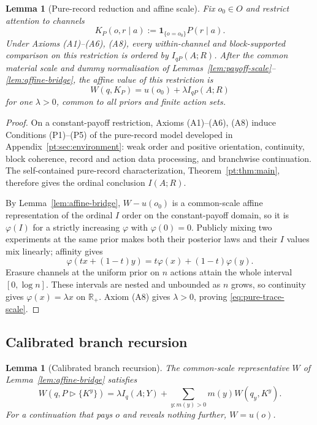 \documentclass[11pt,a4paper]{article}
\newtheorem{lemma}[theorem]{Lemma}
\theoremstyle{definition}
\newcommand{\I}{I}
\newcommand{\1}{\mathbf 1}
\begin{document}
\begin{lemma}[Pure-record reduction and affine scale]\label{lem:trace-engine}
Fix $o_0\in O$ and restrict attention to channels
\[
 K_P(o,r\mid a):=\mathbf 1_{\{o=o_0\}}P(r\mid a).
\]
Under Axioms \textup{(A1)--(A6), (A8)}, every within-channel and block-supported comparison on this restriction is
ordered by $\I_{qP}(A;R)$.  After the common material scale and dummy normalisation of
Lemmas~\ref{lem:payoff-scale}--\ref{lem:affine-bridge}, the affine value of this restriction is
\begin{equation}
 W(q,K_P)=u(o_0)+\lambda\I_{qP}(A;R)
 \label{eq:pure-trace-scale}
\end{equation}
for one $\lambda>0$, common to all priors and finite action sets.
\end{lemma}

\begin{proof}
On a constant-payoff restriction, Axioms \textup{(A1)--(A6), (A8)} induce Conditions
\textup{(P1)--(P5)} of the pure-record model developed in Appendix~\ref{pt:sec:environment}: weak order and positive
orientation, continuity, block coherence, record and action data processing, and branchwise continuation.  The
self-contained pure-record characterization, Theorem~\ref{pt:thm:main}, therefore gives the ordinal conclusion
$\I(A;R)$.

By Lemma~\ref{lem:affine-bridge}, $W-u(o_0)$ is a common-scale affine representation of the ordinal $I$ order on the
constant-payoff domain, so it is
$\varphi(I)$ for a strictly increasing $\varphi$ with $\varphi(0)=0$.  Publicly mixing two experiments at the same
prior makes both their posterior laws and their $I$ values mix linearly; affinity gives
\[
 \varphi(t x+(1-t)y)=t\varphi(x)+(1-t)\varphi(y).
\]
Erasure channels at the uniform prior on $n$ actions attain the whole interval $[0,\log n]$.  These intervals are
nested and unbounded as $n$ grows, so continuity gives $\varphi(x)=\lambda x$ on $\mathbb R_+$.  Axiom
\textup{(A8)} gives $\lambda>0$, proving \eqref{eq:pure-trace-scale}.
\end{proof}

\subsection{Calibrated branch recursion}

\begin{lemma}[Calibrated branch recursion]\label{lem:branch-recursion}
The common-scale representative $W$ of Lemma~\ref{lem:affine-bridge} satisfies
\begin{equation}
 W(q,P\triangleright\{K^y\})
 =\lambda\I_q(A;Y)+\sum_{y:m(y)>0}m(y)W(q_y,K^y).
 \label{eq:branch-recursion}
\end{equation}
For a continuation that pays $o$ and reveals nothing further, $W=u(o)$.
\end{lemma}
\end{document}
